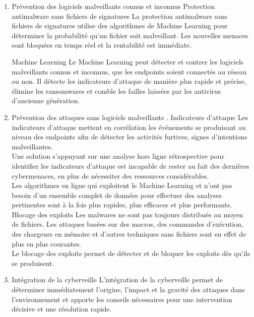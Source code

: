 \begin{enumerate}
 

 \item  Prévention des logiciels malveillants connus et inconnus
 Protection antimalware sans fichiers de signatures
 La protection antimalware sans fichiers de signatures utilise des algorithmes de Machine Learning pour déterminer la probabilité qu’un fichier soit malveillant. Les nouvelles menaces sont bloquées en temps réel et la rentabilité est immédiate.
 
  Machine Learning
 Le Machine Learning peut détecter et contrer les logiciels malveillants connus et inconnus, que les endpoints soient connectés au réseau ou non. Il détecte les indicateurs d’attaque de manière plus rapide et précise, élimine les ransomwares et comble les failles laissées par les antivirus d’ancienne génération.
 
\item  Prévention des attaques sans logiciels malveillants
 . Indicateurs d’attaque
 Les indicateurs d’attaque mettent en corrélation les événements se produisant au niveau des endpoints afin de détecter les activités furtives, signes d’intentions malveillantes.\\ 
 Une solution s’appuyant sur une analyse hors ligne rétrospective pour identifier les indicateurs d’attaque est incapable de rester au fait des dernières cybermenaces, en plus de nécessiter des ressources considérables.\\
  Les algorithmes en ligne qui exploitent le Machine Learning et n’ont pas besoin d’un ensemble complet de données pour effectuer des analyses pertinentes sont à la fois plus rapides, plus efficaces et plus performants.\\
 
  Blocage des exploits
 Les malwares ne sont pas toujours distribués au moyen de fichiers. Les attaques basées sur des macros, des commandes d’exécution, des chargeurs en mémoire et d’autres techniques sans fichiers sont en effet de plus en plus courantes.\\
  Le blocage des exploits permet de détecter et de bloquer les exploits dès qu’ils se produisent.\\
 
 \item   Intégration de la cyberveille
 L’intégration de la cyberveille permet de déterminer immédiatement l’origine, l’impact et la gravité des attaques dans l’environnement et apporte les conseils nécessaires pour une intervention décisive et une résolution rapide.\\
 

\end{enumerate}
